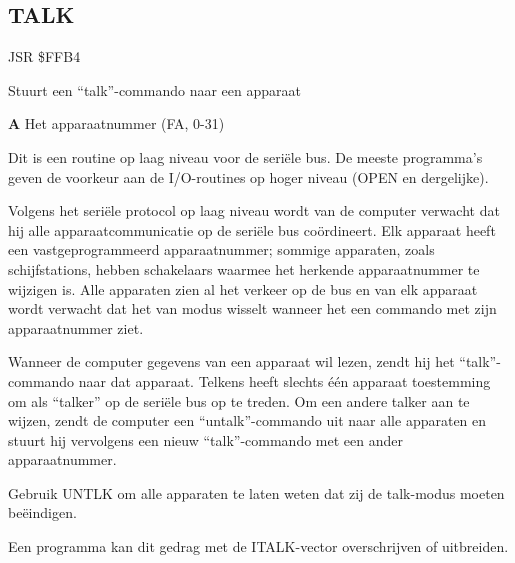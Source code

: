 \subsection{TALK}
\label{KERNAL Jump Table!TALK}
\begin{description}[leftmargin=2cm,style=nextline]
    \item [Adres:] JSR \$FFB4    \item [Omschrijving:] Stuurt een ``talk''-commando naar een apparaat    \item [Invoer:]        \textbf{A} Het apparaatnummer (FA, 0-31)    \item [Opmerkingen:]        Dit is een routine op laag niveau voor de seriële bus. De meeste programma's geven de voorkeur aan de I/O-routines op hoger niveau (OPEN en dergelijke).

        Volgens het seriële protocol op laag niveau wordt van de computer verwacht dat hij alle apparaatcommunicatie op de seriële bus coördineert. Elk apparaat heeft een vastgeprogrammeerd apparaatnummer; sommige apparaten, zoals schijfstations, hebben schakelaars waarmee het herkende apparaatnummer te wijzigen is. Alle apparaten zien al het verkeer op de bus en van elk apparaat wordt verwacht dat het van modus wisselt wanneer het een commando met zijn apparaatnummer ziet.

        Wanneer de computer gegevens van een apparaat wil lezen, zendt hij het ``talk''-commando naar dat apparaat. Telkens heeft slechts één apparaat toestemming om als ``talker'' op de seriële bus op te treden. Om een andere talker aan te wijzen, zendt de computer een ``untalk''-commando uit naar alle apparaten en stuurt hij vervolgens een nieuw ``talk''-commando met een ander apparaatnummer.

        Gebruik UNTLK om alle apparaten te laten weten dat zij de talk-modus moeten beëindigen.

        Een programma kan dit gedrag met de ITALK-vector overschrijven of uitbreiden.    \item [Voorbeeld:]
\end{description}



\newpage
